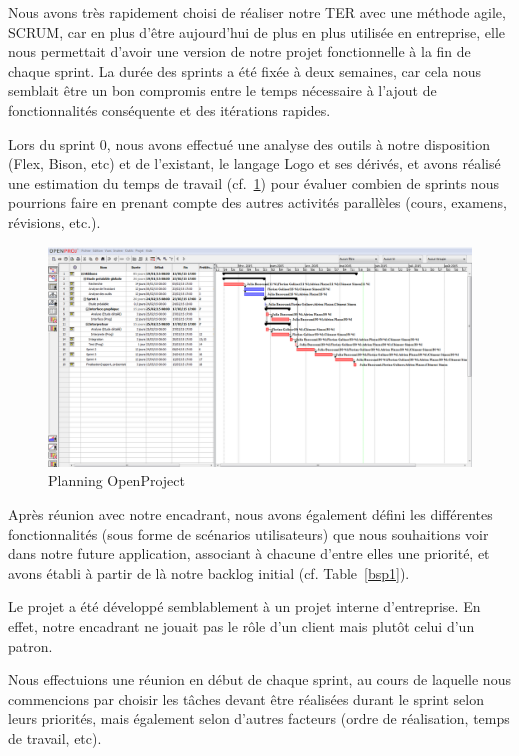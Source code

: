 Nous avons très rapidement choisi de réaliser notre TER avec une méthode agile, SCRUM, car en plus d'être aujourd'hui de plus en plus utilisée en entreprise, elle nous permettait d'avoir une version de notre projet fonctionnelle à la fin de chaque sprint.
La durée des sprints a été fixée à deux semaines, car cela nous semblait être un bon compromis entre le temps nécessaire à l'ajout de fonctionnalités conséquente et des itérations rapides.

Lors du sprint 0, nous avons effectué une analyse des outils à notre disposition (Flex, Bison, etc) et de l'existant, le langage Logo et ses dérivés, et avons réalisé une estimation du temps de travail (cf.~\ref{planning}) pour évaluer combien de sprints nous pourrions faire en prenant compte des autres activités parallèles (cours, examens, révisions, etc.).
\begin{figure}[h]
\includegraphics[scale=0.35]{doc/gestionProjet/planning.PNG}
\caption{\label{planning} Planning OpenProject}
\end{figure}

Après réunion avec notre encadrant, nous avons également défini les différentes fonctionnalités (sous forme de scénarios utilisateurs) que nous souhaitions voir dans notre future application, associant à chacune d'entre elles une priorité, et avons établi à partir de là notre backlog initial (cf. Table~\ref{bsp1}).

Le projet a été développé semblablement à un projet interne d'entreprise. En effet, notre encadrant ne jouait pas le rôle d'un client mais plutôt celui d'un patron.

Nous effectuions une réunion en début de chaque sprint, au cours de laquelle nous commencions par choisir les tâches devant être réalisées durant le sprint selon leurs priorités, mais également selon d'autres facteurs (ordre de réalisation, temps de travail, etc). 


